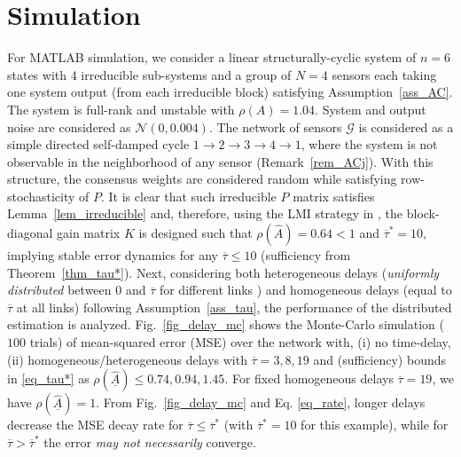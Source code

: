 \documentclass[journal]{IEEEtran}
\def\mc{\mathcal}
\begin{document}
 \section{Simulation} \label{sec_sim}
For MATLAB simulation, we consider a linear structurally-cyclic system of $n=6$ states with $4$ irreducible sub-systems and a group of $N=4$ sensors each taking one system output (from each irreducible block) satisfying Assumption~\ref{ass_AC}. The system is full-rank and unstable with $\rho(A)=1.04$. System and output noise are considered as $\mc{N}(0,0.004)$. The network of sensors $\mc{G}$ is considered as a simple directed self-damped cycle $1 \rightarrow 2 \rightarrow 3 \rightarrow 4 \rightarrow 1$, where  the system is not observable in the neighborhood of any sensor  (Remark~\ref{rem_ACj}). With this structure, the consensus weights are considered random while satisfying row-stochasticity of $P$. It is clear that such irreducible $P$ matrix satisfies Lemma~\ref{lem_irreducible} and, therefore, using the LMI strategy in \cite{usman_cdc:11,jstsp}, the block-diagonal gain matrix $K$ is designed such that $\rho(\widehat{A})=0.64<1$ and $\overline{\tau}^* =10$, implying stable error dynamics for any $\overline{\tau} \leq 10$ (sufficiency from Theorem~\ref{thm_tau*}). Next, considering both  heterogeneous delays (\textit{uniformly distributed} between $0$ and $\overline{\tau}$ for different links \cite{Themis_delay}) and  homogeneous delays (equal to $\overline{\tau}$ at all links) following Assumption~\ref{ass_tau},  the performance of the distributed estimation is analyzed. Fig.~\ref{fig_delay_mc} shows the Monte-Carlo simulation ($100$ trials) of mean-squared error (MSE) over the network with, (i) no time-delay, (ii) homogeneous/heterogeneous delays with $\overline{\tau}=3,8,19$  and (sufficiency) bounds in \eqref{eq_tau*} as  ${\rho(\underline{\widehat{A}})\leq 0.74, 0.94, 1.45}$. For fixed homogeneous delays $\overline{\tau}=19$, we have ${\rho(\underline{\widehat{A}})=1}$. From Fig.~\ref{fig_delay_mc} and Eq. \eqref{eq_rate}, longer delays decrease the MSE decay rate for $\overline{\tau}\leq \overline{\tau}^*$ (with $\overline{\tau}^*=10$ for this example), while for $\overline{\tau}> \overline{\tau}^*$ the error  \textit{may not necessarily} converge.
\end{document}
